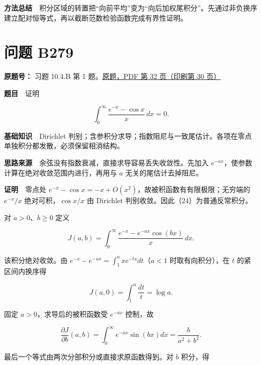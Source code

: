 \documentclass[11pt,a4paper]{article}
\begin{document}
\textbf{方法总结}　积分区域的转置把``向前平均''变为``向后加权尾积分''。先通过非负换序建立配对恒等式，再以截断范数检验函数完成有界性证明。

\section{问题 B279}\label{ux95eeux9898-b279}

\textbf{原题号：} 习题 10.4.B 第 1
题。\href{https://zj139.github.io/math-notes/files/problems/楼分析习题-v2.pdf\#page=32}{原题，PDF
第 32 页（印刷第 30 页）}

\textbf{题目}　证明

\begin{equation}
\int_0^\infty\frac{e^{-x}-\cos x}{x}\,dx=0.
\tag{24}
\end{equation}

\textbf{基础知识}　Dirichlet
判别；含参积分求导；指数阻尼与一致尾估计。各项在零点单独积分都发散，必须保留相消结构。

\textbf{思路来源}　余弦没有指数衰减，直接求导容易丢失收敛性。先加入
\(e^{-ax}\)，使参数计算在绝对收敛范围内进行，再用与 \(a\)
无关的尾估计去掉阻尼。

\textbf{证明}　零点处
\(e^{-x}-\cos x=-x+O(x^2)\)，故被积函数有有限极限；无穷端的 \(e^{-x}/x\)
绝对可积，\(\cos x/x\) 由 Dirichlet 判别收敛。因此（24）为普通反常积分。

对 \(a>0\)、\(b\ge0\) 定义

\begin{equation}
J(a,b)=\int_0^\infty\frac{e^{-x}-e^{-ax}\cos(bx)}x\,dx.
\tag{25}
\end{equation}

该积分绝对收敛。由 \(e^{-x}-e^{-ax}=\int_1^a x e^{-tx}dt\)（\(a<1\)
时取有向积分），在 \(t\) 的紧区间内换序得

\begin{equation}
J(a,0)=\int_1^a\frac{dt}{t}=\log a.
\tag{26}
\end{equation}

固定 \(a>0\)，求导后的被积函数受 \(e^{-ax}\) 控制，故

\begin{equation}
\frac{\partial J}{\partial b}(a,b)
=\int_0^\infty e^{-ax}\sin(bx)dx
=\frac b{a^2+b^2}.
\tag{27}
\end{equation}

最后一个等式由两次分部积分或直接求原函数得到。对 \(b\) 积分，得
\end{document}
